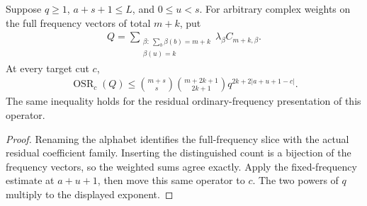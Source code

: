 \begin{lemma}
    \label{thm:aklv_target_frequency_rank}
    \leanok
    Suppose $q\ge1$, $a+s+1\le L$, and $0\le u<s$.
    For arbitrary complex weights on the full frequency vectors of total $m+k$,
    put
    \begin{align*}
        Q=\sum_{\substack{\beta:\ \sum_b\beta(b)=m+k \\\beta(u)=k}}
        \lambda_\beta C_{m+k,\beta}.
    \end{align*}
    At every target cut $c$,
    \begin{align*}
        \operatorname{OSR}_c(Q)
        \le \binom{m+s}{s}\binom{m+2k+1}{2k+1}
        q^{2k+2|a+u+1-c|}.
    \end{align*}
    The same inequality holds for the residual ordinary-frequency presentation
    of this operator.
\end{lemma}
\begin{proof}
    \leanok
    Renaming the alphabet identifies the full-frequency slice with the actual
    residual coefficient family. Inserting the distinguished count is a
    bijection of the frequency vectors, so the weighted sums agree exactly.
    Apply the fixed-frequency estimate at $a+u+1$, then move this same
    operator to $c$. The two powers of $q$ multiply to the displayed exponent.
\end{proof}

